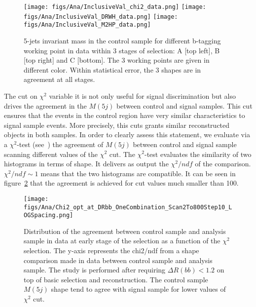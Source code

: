 \begin{figure}[!Hhtbp]
  \begin{center}
    \texttt{[image: figs/Ana/InclusiveVal\_chi2\_data.png]}
    \texttt{[image: figs/Ana/InclusiveVal\_DRWH\_data.png]}
    \texttt{[image: figs/Ana/InclusiveVal\_M2HP\_data.png]}
    \caption{5-jets invariant mass in the control sample for different b-tagging working point in data within 3 stages of selection: A [top left], B [top right] and C [bottom]. The 3 working points are given in different color. Within statistical error, the 3 shapes are in agreement at all stages.}
    \label{fig:StageWPData}
  \end{center}
\end{figure}

The cut on $\chi^{2}$ variable it is not only useful for signal discrimination but also drives the agreement in the $M(5j)$ between control and signal samples. This cut ensures that the events in the control region have very similar characteristics to signal sample events. More precisely, this cuts grants similar reconstructed objects in both samples. In order to clearly assess this statement, we evaluate via a $\chi^{2}$-test (see~\cite{2006physics...5123G}) the agreement of $M(5j)$ between control and signal sample scanning different values of the $\chi^{2}$ cut. The $\chi^{2}$-test evaluates the similarity of two histograms in terms of shape. It delivers as output the $\chi^{2}/ndf$ of the comparison. $\chi^{2}/ndf\sim 1$ means that the two histograms are compatible. It can be seen in figure~\ref{fig:optchi2} that the agreement is achieved for cut values much smaller than 100. 

\begin{figure}[!Hhtbp]
  \begin{center}
    \texttt{[image: figs/Ana/Chi2\_opt\_at\_DRbb\_OneCombination\_Scan2To800Step10\_LOGSpacing.png]} %
    \caption{Distribution of the agreement between control sample and analysis sample in data at early stage of the selection as a function of the $\chi^2$ selection. The y-axis represents the chi2/ndf from a shape comparison made in data between control sample and analysis sample. The study is performed after requiring $\Delta R(bb) <1.2$ on top of basic selection and reconstruction. The control sample $M(5j)$ shape tend to agree with signal sample for lower values of $\chi^2$ cut.}
    \label{fig:optchi2}
  \end{center}
\end{figure}

